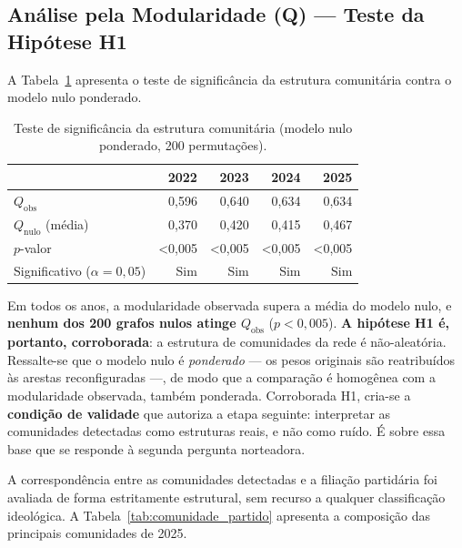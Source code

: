 \documentclass[
      12pt,
      a4paper,
      openright,
      oneside,
      chapter=TITLE,
      section=TITLE,
      english,
      french,
      spanish,
      brazilian
    ]{abntex2}
\begin{document}
    \subsection{Análise pela Modularidade (Q) --- Teste da Hipótese H1}
    
    A Tabela~\ref{tab:null_model} apresenta o teste de significância da estrutura comunitária contra o modelo nulo ponderado.
    
    \begin{table}[H]
    \centering
    \caption{Teste de significância da estrutura comunitária (modelo nulo ponderado, 200 permutações).}
    \label{tab:null_model}
    \begin{tabular}{lrrrr}
    \toprule
     & \textbf{2022} & \textbf{2023} & \textbf{2024} & \textbf{2025} \\
    \midrule
    $Q_{\text{obs}}$                       & 0,596  & 0,640  & 0,634  & 0,634  \\
    $Q_{\text{nulo}}$ (média)              & 0,370  & 0,420  & 0,415  & 0,467  \\
    $p$-valor                              & <0,005 & <0,005 & <0,005 & <0,005 \\
    Significativo ($\alpha=0{,}05$)        & Sim    & Sim    & Sim    & Sim    \\
    \bottomrule
    \end{tabular}
    \end{table}
    
    Em todos os anos, a modularidade observada supera a média do modelo nulo, e \textbf{nenhum dos 200 grafos nulos atinge $Q_{\text{obs}}$} ($p<0{,}005$). \textbf{A hipótese H1 é, portanto, corroborada}: a estrutura de comunidades da rede é não-aleatória. Ressalte-se que o modelo nulo é \emph{ponderado} --- os pesos originais são reatribuídos às arestas reconfiguradas ---, de modo que a comparação é homogênea com a modularidade observada, também ponderada. Corroborada H1, cria-se a \textbf{condição de validade} que autoriza a etapa seguinte: interpretar as comunidades detectadas como estruturas reais, e não como ruído. É sobre essa base que se responde à segunda pergunta norteadora.
    
    A correspondência entre as comunidades detectadas e a filiação partidária foi avaliada de forma estritamente estrutural, sem recurso a qualquer classificação ideológica. A Tabela~\ref{tab:comunidade_partido} apresenta a composição das principais comunidades de 2025.
    
\end{document}

